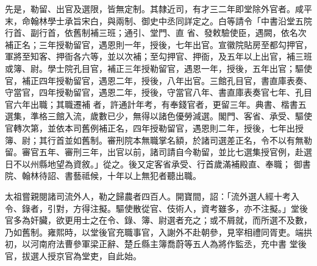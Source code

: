 \begin{pinyinscope}
 先是，勒留、出官及選限，皆無定制。其隸近司，有才三二年即堂除外官者。咸平末，命翰林學士承旨宋白，與兩制、御史中丞同詳定之。白等請令「中書沿堂五院行首、副行首，依舊制補三班；通引、堂門、直
 省、發敕驗使臣，遇闕，依名次補正名；三年授勒留官，遇恩則一年，授後，七年出官。宣徽院貼房至都勾押官，軍將至知客、押衙各六等，並以次補；至勾押官、押衙，及五年以上出官，補三班或簿、尉。學士院孔目官，補正三年授勒留官，遇恩一年，授後，五年出官；驅使官，補正四年授勒留官，遇恩二年，授後，八年出官。三館孔目官，書直庫表奏、守當官，四年授勒留官，遇恩二年，授後，守當官八年、書直庫表奏官七年、孔目官六年出職；其職遷補
 者，許通計年考，有奉錢官者，更留三年。典書、楷書五選集，準格三館入流，歲數已少，無得以諸色優勞減選。閣門、客省、承受、驅使官轉次第，並依本司舊例補正名，四年授勒留官，遇恩則二年，授後，七年出授簿、尉；其行首並如舊制。審刑院本無職掌名額，於諸司選差正名，令不以有無勒留。審官五年、審刑三年，出官以前，諸司請自今勒留，並比七選集授官例，赴選日不以州縣地望為資敘。」從之。後又定客省承受、行首歲滿補殿直、奉職；
 御書院、翰林待詔、書藝祗候，十年以上無犯者聽出職。



 太祖嘗親閱諸司流外人，勒之歸農者四百人。開寶間，詔：「流外選人經十考入令、錄者，引對，方得注擬。驅使散從官、伎術人，資考雖多，亦不注擬。」堂後官多為奸臟，欲更用士之在令、錄、簿、尉選者充之；或不屑就，而所選不及數，乃如舊制。雍熙時，以堂後官充職事官，入謝外不赴朝參，見宰相禮同胥吏。端拱初，以河南府法曹參軍梁正辭、楚丘縣主簿喬蔚等五人為將作監丞，充中書
 堂後官，拔選人授京官為堂吏，自此始。



\end{pinyinscope}